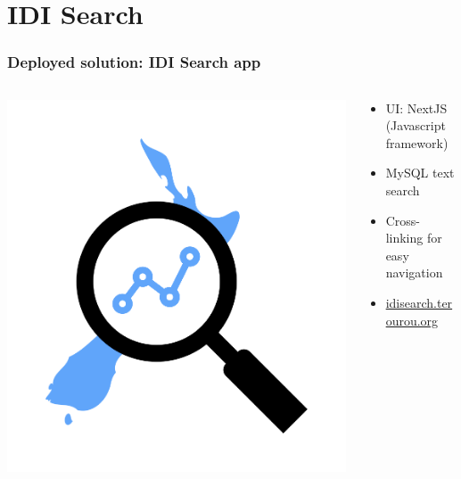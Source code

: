 \documentclass[aspectratio=169]{beamer}
\begin{document}
\section{IDI Search}

\begin{frame}
    \frametitle{Deployed solution: IDI Search app}

    \begin{columns}
        \begin{column}{0.5\textwidth}
            \begin{center}
                \includegraphics[width=0.5\linewidth]{idisearch.png}
            \end{center}
        \end{column}
        \begin{column}{0.5\textwidth}
            \begin{itemize}
                \item UI: NextJS (Javascript framework)
                \item MySQL text search
                \item Cross-linking for easy navigation
                \item \url{idisearch.terourou.org}
            \end{itemize}
        \end{column}
    \end{columns}

\end{frame}
\end{document}
